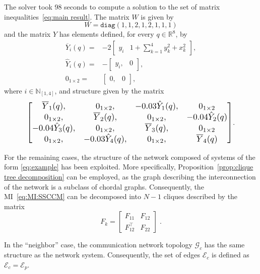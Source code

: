 \documentclass[10pt,twocolumn,twoside]{IEEEtran}
\newcounter{para}
\newcommand\mypara{\par}
\theoremstyle{plain}
\theoremstyle{definition}
\theoremstyle{remark}
\begin{document}
\mypara The solver took 98  seconds to compute a solution to the set of matrix inequalities~\eqref{eq:main result}. The matrix $W$ is given by
\begin{equation*}
		W=\mathbin{\mathtt{diag}}(1,1,2,1,2,1,1,1)
\end{equation*}
and the matrix $Y$ has elements defined, for every $q\in\mathbb{R}^8$, by
\begin{align*}
	\overline{Y}_i(q)=&-2\begin{bmatrix}
	y_i&1+\sum_{k=1}^4 y_k^2+x_k^2
	\end{bmatrix},\\
	\hat{Y}_i(q)=&-\begin{bmatrix}y_i,&0\end{bmatrix},\\
	0_{1\times2}=&\begin{bmatrix}0,&0\end{bmatrix},
\end{align*}
where $i\in\mathbb{N}_{[1,4]}$, and structure given by the matrix
\begin{equation}\label{eq:example:Y:general}
		\resizebox*{0.85\columnwidth}{!}{$\begin{bmatrix}
			\overline{Y}_1(q),&0_{1\times 2},&-0.03\hat{Y}_1(q),&0_{1\times2}\\
			0_{1\times 2},&\overline{Y}_2(q),&0_{1\times 2},&-0.04\hat{Y}_2(q)\\
			-0.04\hat{Y}_3(q),&0_{1\times 2},&\overline{Y}_3(q),&0_{1\times 2}\\
			0_{1\times 2},&-0.03\hat{Y}_4(q),&0_{1\times 2},&\overline{Y}_4(q)
		\end{bmatrix}$}.
\end{equation}

\mypara For the remaining cases, the structure of the network composed of systems of the form \eqref{eq:example} has been exploited. More specifically, Proposition~\ref{prop:clique tree decomposition} can be employed, as the graph describing the interconnection of the network is a subclass of chordal graphs. Consequently, the MI~\eqref{eq:MI:SSCCM} can be decomposed into $N-1$ cliques  described by the matrix
\begin{equation*}
	F_k=\begin{bmatrix}
		F_{11}&F_{12}\\
		F_{12}^\top&F_{22}
	\end{bmatrix}\;.
\end{equation*}

\mypara In the ``neighbor'' case, the communication network topology $\mathscr{G}_c$ has the same structure as the network system. Consequently, the set of edges $\mathscr{E}_c$ is defined as $\mathscr{E}_c=\mathscr{E}_p$.
\end{document}
